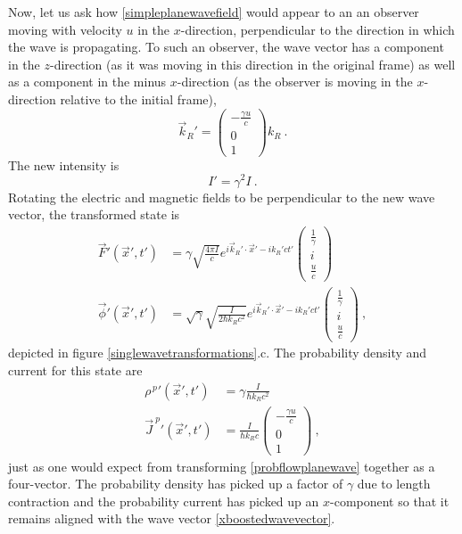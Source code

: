 \documentclass[12pt,secnumarabic,amsmath,amssymb,balancelastpage,nofootinbib]{article}
\begin{document}
Now, let us ask how \eqref{simpleplanewavefield} would appear to an an observer moving with velocity $u$ in the $x$-direction, perpendicular to the direction in which the wave is propagating.  To such an observer, the wave vector has a component in the $z$-direction (as it was moving in this direction in the original frame) as well as a component in the minus $x$-direction (as the observer is moving in the $x$-direction relative to the initial frame),
\begin{equation}
\vec{k}_R'=\begin{pmatrix}
- \frac{\gamma u}{c} \\
0 \\
1
\end{pmatrix} k_R
\ .
\label{xboostedwavevector}
\end{equation}
The new intensity is
\begin{equation}
I'=\gamma^2 I
\ .
\end{equation}
Rotating the electric and magnetic fields to be perpendicular to the new wave vector, the transformed state is
\begin{align}
\vec{F}'(\vec{x}',t')&=\gamma \sqrt{\frac{4 \pi I}{c}} e^{i \vec{k}_R' \cdot \vec{x}'-i k_R' c t'}
\begin{pmatrix}
\frac{1}{\gamma}\\
i \\
\frac{u}{c}
\end{pmatrix}
\nonumber
\\
\vec{\phi}'(\vec{x}',t')&=\sqrt{\gamma} \sqrt{\frac{I}{2 \hbar k_R c^2}} e^{i \vec{k}_R' \cdot \vec{x}'-i k_R' c t'}
\begin{pmatrix}
\frac{1}{\gamma} \\
i \\
\frac{u}{c}
\end{pmatrix}
\ ,
\label{xboostedstatevectors}
\end{align}
depicted in figure \ref{singlewavetransformations}.c.  The probability density and current for this state are
\begin{align}
\rho^{\,p}{}'(\vec{x}',t')&=\gamma \frac{I}{\hbar k_R c^2}
\nonumber
\\
\vec{J}^{\:p}{}'(\vec{x}',t')&=\frac{I}{\hbar k_R c}\begin{pmatrix}
- \frac{\gamma u}{c} \\
0 \\
1
\end{pmatrix}
\ ,
\label{probflowxboosted}
\end{align}
just as one would expect from transforming \eqref{probflowplanewave} together as a four-vector.  The probability density has picked up a factor of $\gamma$ due to length contraction and the probability current has picked up an $x$-component so that it remains aligned with the wave vector \eqref{xboostedwavevector}.
\end{document}
